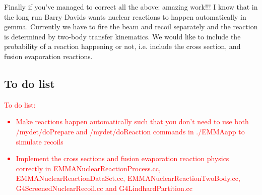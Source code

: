 \documentclass[letter,11pt]{article}
\newcommand{\filefont}[1]{{\scriptsize\ttfamily\selectfont #1}\xspace}
\begin{document}
Finally if you've managed to correct all the above: amazing work!!! I know that in the long run Barry Davids wants nuclear reactions to happen automatically in gemma. Currently we have to fire the beam and recoil separately and the reaction is determined by two-body transfer kinematics. We would like to include the probability of a reaction happening or not, i.e. include the cross section, and fusion evaporation reactions.

\subsection{To do list}

\textcolor{red}{To do list:
\begin{itemize}
\item Make reactions happen automatically such that you don't need to use both \filefont{/mydet/doPrepare} and \filefont{/mydet/doReaction} commands in ./EMMAapp to simulate recoils
\item Implement the cross sections and fusion evaporation reaction physics correctly in EMMANuclearReactionProcess.cc, EMMANuclearReactionDataSet.cc, EMMANuclearReactionTwoBody.cc, G4ScreenedNuclearRecoil.cc and G4LindhardPartition.cc
\end{itemize}
}
\end{document}
